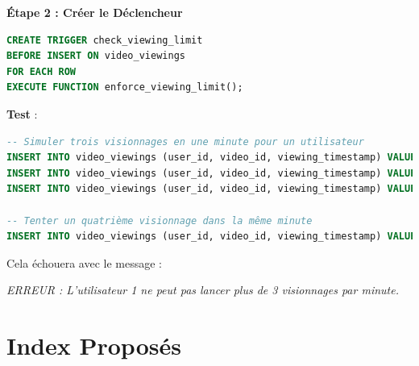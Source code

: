 \documentclass{article}
\begin{document}
\textbf{Étape 2 : Créer le Déclencheur}

\begin{lstlisting}[language=SQL]
CREATE TRIGGER check_viewing_limit
BEFORE INSERT ON video_viewings
FOR EACH ROW
EXECUTE FUNCTION enforce_viewing_limit();
\end{lstlisting}

\textbf{Test} :

\begin{lstlisting}[language=SQL]
-- Simuler trois visionnages en une minute pour un utilisateur
INSERT INTO video_viewings (user_id, video_id, viewing_timestamp) VALUES (1, 101, NOW());
INSERT INTO video_viewings (user_id, video_id, viewing_timestamp) VALUES (1, 102, NOW());
INSERT INTO video_viewings (user_id, video_id, viewing_timestamp) VALUES (1, 103, NOW());

-- Tenter un quatrième visionnage dans la même minute
INSERT INTO video_viewings (user_id, video_id, viewing_timestamp) VALUES (1, 104, NOW());
\end{lstlisting}

Cela échouera avec le message :

\textit{ERREUR : L'utilisateur 1 ne peut pas lancer plus de 3 visionnages par minute.}

\section{Index Proposés}
\end{document}
